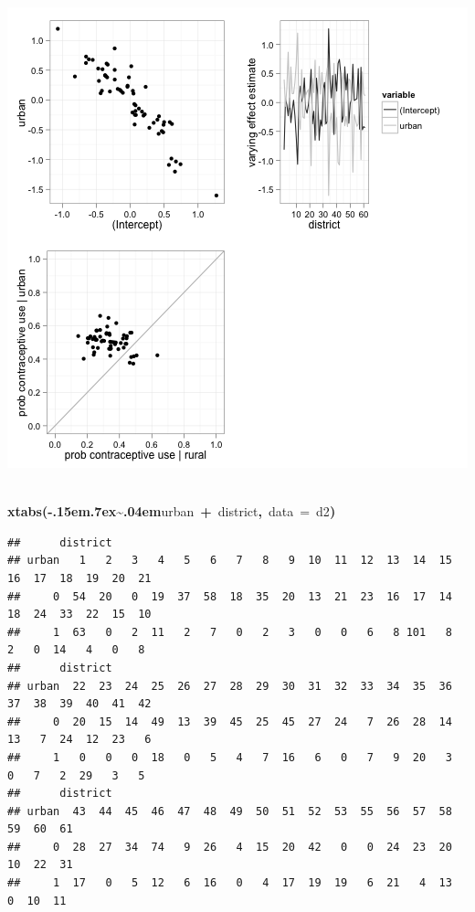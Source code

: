\documentclass{article}
\makeatletter
\newcommand{\hlfunctioncall}[1]{\textcolor[rgb]{.5,0,.33}{\textbf{#1}}}%
\newcommand{\hlkeyword}[1]{\textbf{#1}}%
\newcommand{\hlargument}[1]{\textcolor[rgb]{.69,.25,.02}{#1}}%
\newcommand{\hlsymbol}[1]{#1}%
\def\urltilda{\kern -.15em\lower .7ex\hbox{\~{}}\kern .04em}%
\newcommand{\hlstd}[1]{\textcolor[rgb]{0,0,0}{#1}}%
\newenvironment{kframe}{%
 \def\FrameCommand##1{\hskip\@totalleftmargin \hskip-\fboxsep
 \colorbox{shadecolor}{##1}\hskip-\fboxsep
     \hskip-\linewidth \hskip-\@totalleftmargin \hskip\columnwidth}%
 \MakeFramed {\advance\hsize-\width
   \@totalleftmargin\z@ \linewidth\hsize
   \@setminipage}}%
 {\par\unskip\endMakeFramed}
\newenvironment{knitrout}{}{} %
\makeatother
\begin{document}
\begin{knitrout}
{\begin{kframe}
\includegraphics{urban-model} \begin{flushleft}
\ttfamily\noindent
\hspace*{\fill}\\
\hlstd{}\hlfunctioncall{xtabs}\hlkeyword{(}\hlkeyword{\urltilda{}}\hlsymbol{urban}{\ }\hlkeyword{+}{\ }\hlsymbol{district}\hlkeyword{,}{\ }\hlargument{data}{\ }\hlargument{=}{\ }\hlsymbol{d2}\hlkeyword{)}\mbox{}
\normalfont
\end{flushleft}
\begin{verbatim}
##      district
## urban   1   2   3   4   5   6   7   8   9  10  11  12  13  14  15  16  17  18  19  20  21
##     0  54  20   0  19  37  58  18  35  20  13  21  23  16  17  14  18  24  33  22  15  10
##     1  63   0   2  11   2   7   0   2   3   0   0   6   8 101   8   2   0  14   4   0   8
##      district
## urban  22  23  24  25  26  27  28  29  30  31  32  33  34  35  36  37  38  39  40  41  42
##     0  20  15  14  49  13  39  45  25  45  27  24   7  26  28  14  13   7  24  12  23   6
##     1   0   0   0  18   0   5   4   7  16   6   0   7   9  20   3   0   7   2  29   3   5
##      district
## urban  43  44  45  46  47  48  49  50  51  52  53  55  56  57  58  59  60  61
##     0  28  27  34  74   9  26   4  15  20  42   0   0  24  23  20  10  22  31
##     1  17   0   5  12   6  16   0   4  17  19  19   6  21   4  13   0  10  11
\end{verbatim}
\end{kframe}}
\end{knitrout}
\end{document}
